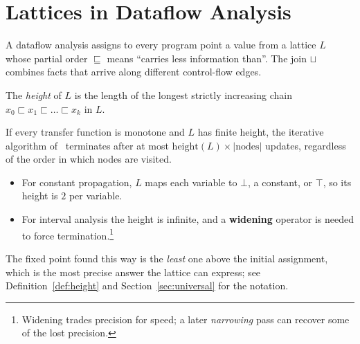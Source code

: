 \section{Lattices in Dataflow Analysis}\label{sec:lattices}

A dataflow analysis assigns to every program point a value from a lattice $L$
whose partial order $\sqsubseteq$ means ``carries less information than''.
The join $\sqcup$ combines facts that arrive along different control-flow edges.

\begin{definition}\label{def:height}
The \emph{height} of $L$ is the length of the longest strictly increasing chain
$x_0 \sqsubset x_1 \sqsubset \dots \sqsubset x_k$ in $L$.
\end{definition}

If every transfer function is monotone and $L$ has finite height, the iterative
algorithm of~\cite{kildall1973} terminates after at most
$\text{height}(L) \times |\text{nodes}|$ updates, regardless of the order in which
nodes are visited.

\begin{itemize}
  \item For constant propagation, $L$ maps each variable to $\bot$, a constant, or
        $\top$, so its height is $2$ per variable.
  \item For interval analysis the height is infinite, and a \textbf{widening}
        operator is needed to force termination.\footnote{Widening trades
        precision for speed; a later \emph{narrowing} pass can recover some of
        the lost precision.}
\end{itemize}

The fixed point found this way is the \emph{least} one above the initial
assignment, which is the most precise answer the lattice can express; see
Definition~\ref{def:height} and Section~\ref{sec:universal} for the notation.
